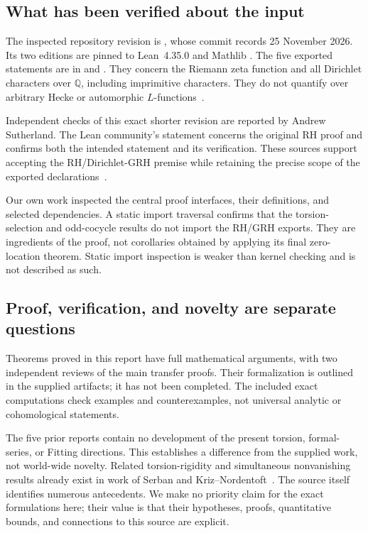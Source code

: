 \documentclass[11pt,letterpaper]{article}
\theoremstyle{remark}
\newcommand{\Q}{\mathbb Q}
\begin{document}
\subsection{What has been verified about the input}

The inspected repository revision is
, whose commit records
25 November 2026. Its two editions are pinned to Lean~4.35.0 and Mathlib
.
The five exported statements are in  and
. They concern the Riemann zeta function and all
Dirichlet characters over $\Q$, including imprimitive characters.
They do not quantify over arbitrary Hecke or automorphic
$L$-functions~\cite{repo,shortverify}.

Independent checks of this exact shorter revision are reported by Andrew
Sutherland. The Lean community's statement concerns the original RH proof
and confirms both the intended statement and its verification. These
sources support accepting the RH/Dirichlet-GRH premise while retaining the
precise scope of the exported declarations~\cite{shortverify,community}.

Our own work inspected the central proof interfaces, their definitions, and
selected dependencies. A static import traversal confirms that the
torsion-selection and odd-cocycle results do not import the RH/GRH exports.
They are ingredients of the proof, not corollaries obtained by applying its
final zero-location theorem. Static import inspection is weaker than
kernel checking and is not described as such.

\subsection{Proof, verification, and novelty are separate questions}

Theorems proved in this report have full mathematical arguments, with two
independent reviews of the main transfer proofs. Their formalization is
outlined in the supplied artifacts; it has not been completed. The
included exact computations check examples and counterexamples, not
universal analytic or cohomological statements.

The five prior reports contain no development of the present torsion,
formal-series, or Fitting directions. This establishes a difference from
the supplied work, not world-wide novelty. Related torsion-rigidity and
simultaneous nonvanishing results already exist in work of Serban and
Kriz--Nordentoft~\cite{serban,kn}. The source itself identifies numerous
antecedents. We make no priority claim for the exact formulations here;
their value is that their hypotheses, proofs, quantitative bounds, and
connections to this source are explicit.
\end{document}
